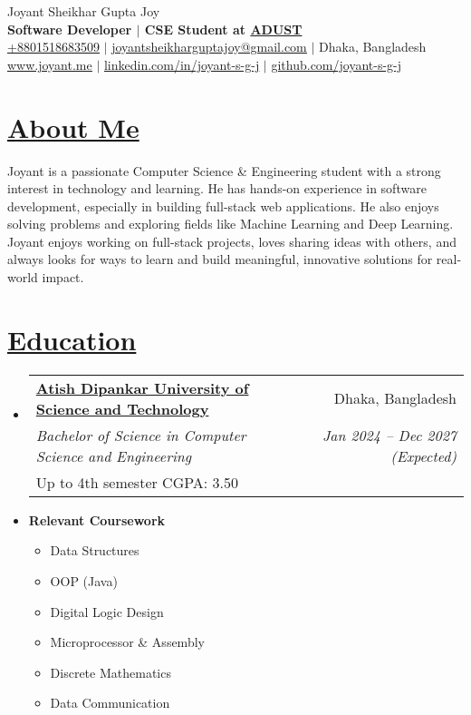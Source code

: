 \documentclass[a4paper, 11pt]{article}
\newcommand{\resumeSection}[2]{
  \section{\textbf{\href{#1}{#2}}}
}
\newcommand{\resumeEduSubheading}[6]{
  \vspace{-2pt}\item
    \begin{tabularx}{\textwidth}[t]{X r}
      \textbf{\href{#1}{#2}} & #3 \\
      {\textit{\small #4}} & \textit{\small #5} \\
      {\small #6}
    \end{tabularx}\vspace{-7pt}
}
\newcommand{\resumeCourseheading}[1]{
  \vspace{-2pt}\item
    \textbf{#1}\vspace{-7pt} \\
}
\newcommand{\resumeCoursework}[1]{
  \vspace{2pt}
  \begin{multicols}{3}
    \begin{itemize}[leftmargin=*, label=\textbullet, itemsep=2pt]
      #1
    \end{itemize}
  \end{multicols}
}
\newcommand{\resumeSubHeadingListStart}{\begin{itemize}[leftmargin=0in, label={}]}
\newcommand{\resumeSubHeadingListEnd}{\end{itemize}}
\begin{document}
{\Huge \rmfamily Joyant Sheikhar Gupta Joy} \\ \vspace{1pt}
\small \textbf{Software Developer $|$ CSE Student at \href{https://www.adust.edu.bd/}{ADUST}} \\ \vspace{2pt}
\href{tel:+8801518683509}{\underline{+8801518683509}} $|$ 
\href{mailto:joyantsheikharguptajoy@gmail.com}{\underline{joyantsheikharguptajoy@gmail.com}} $|$ 
Dhaka, Bangladesh \\ \vspace{1pt}
\href{https://joyant.me/}{\underline{www.joyant.me}} $|$
\href{https://www.linkedin.com/in/joyant-s-g-j/}{\underline{linkedin.com/in/joyant-s-g-j}} $|$
\href{https://github.com/joyant-s-g-j}{\underline{github.com/joyant-s-g-j}}

\resumeSection{https://joyant.me/about}{About Me}
    Joyant is a passionate Computer Science \& Engineering student with a strong interest in technology and learning. He has hands-on experience in software development, especially in building full-stack web applications. He also enjoys solving problems and exploring fields like Machine Learning and Deep Learning. Joyant enjoys working on full-stack projects, loves sharing ideas with others, and always looks for ways to learn and build meaningful, innovative solutions for real-world impact.

\resumeSection{https://joyant.me/education}{Education}
  \resumeSubHeadingListStart
    \resumeEduSubheading
        {https://www.adust.edu.bd/\#}{Atish Dipankar University of Science and Technology}{Dhaka, Bangladesh}
        {Bachelor of Science in Computer Science and Engineering }{Jan 2024 -- Dec 2027 (Expected)}
        {Up to 4th semester CGPA: 3.50}
    \resumeCourseheading{Relevant Coursework}
        \resumeCoursework{
            \item Data Structures
            \item OOP (Java)
            \item Digital Logic Design
            \item Microprocessor \& Assembly
            \item Discrete Mathematics
            \item Data Communication
        }
  \resumeSubHeadingListEnd
\end{document}
